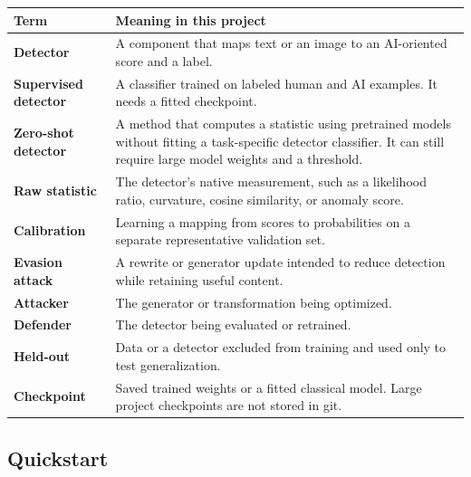 {\scriptsize\setlength{\tabcolsep}{3pt} %
\begin{longtable}[]{@{}
  >{\raggedright\arraybackslash}p{}
  >{\raggedright\arraybackslash}p{}@{}}
\toprule\noalign{}
\begin{minipage}[b]{\linewidth}\raggedright
Term
\end{minipage} & \begin{minipage}[b]{\linewidth}\raggedright
Meaning in this project
\end{minipage} \\
\midrule\noalign{}
\endhead
\bottomrule\noalign{}
\endlastfoot
\textbf{Detector} & A component that maps text or an image to an
AI-oriented score and a label. \\
\textbf{Supervised detector} & A classifier trained on labeled human and
AI examples. It needs a fitted checkpoint. \\
\textbf{Zero-shot detector} & A method that computes a statistic using
pretrained models without fitting a task-specific detector classifier.
It can still require large model weights and a threshold. \\
\textbf{Raw statistic} & The detector's native measurement, such as a
likelihood ratio, curvature, cosine similarity, or anomaly score. \\
\textbf{Calibration} & Learning a mapping from scores to probabilities
on a separate representative validation set. \\
\textbf{Evasion attack} & A rewrite or generator update intended to
reduce detection while retaining useful content. \\
\textbf{Attacker} & The generator or transformation being optimized. \\
\textbf{Defender} & The detector being evaluated or retrained. \\
\textbf{Held-out} & Data or a detector excluded from training and used
only to test generalization. \\
\textbf{Checkpoint} & Saved trained weights or a fitted classical model.
Large project checkpoints are not stored in git. \\
\end{longtable}
}

\subsection{Quickstart}\label{record-docs-research-guide-md-quickstart}


